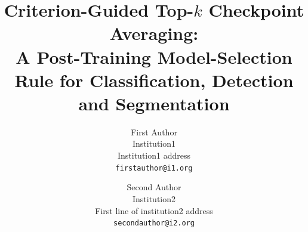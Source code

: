 \documentclass[10pt,twocolumn,letterpaper]{article}
\title{Criterion-Guided Top-$k$ Checkpoint Averaging:\\
A Post-Training Model-Selection Rule for Classification, Detection and Segmentation}
\author{First Author\\
Institution1\\
Institution1 address\\
{\tt\small firstauthor@i1.org}
\and
Second Author\\
Institution2\\
First line of institution2 address\\
{\tt\small secondauthor@i2.org}
}
\begin{document}
\maketitle










{
    \small
    
    
}
\end{document}
